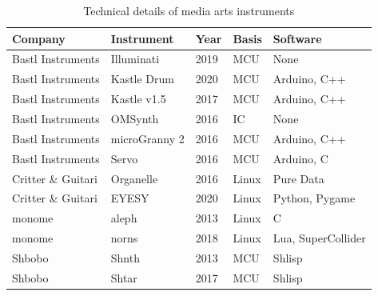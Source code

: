 \begin{table}[ht]
    \centering
    \begin{tabular}{ | l |  l | l | l | l |}
        \hline
        \textbf{Company} & \textbf{Instrument} & \textbf{Year} & \textbf{Basis} & \textbf{Software} \\
        \hline
        Bastl Instruments   & Illuminati    & 2019  & MCU       & None                \\
        \hline
        Bastl Instruments   & Kastle Drum   & 2020  & MCU       & Arduino, C++        \\
        \hline
        Bastl Instruments   & Kastle v1.5   & 2017  & MCU       & Arduino, C++        \\
        \hline
        Bastl Instruments   & OMSynth       & 2016  & IC        & None                \\
        \hline
        Bastl Instruments   & microGranny 2 & 2016  & MCU       & Arduino, C++        \\
        \hline
        Bastl Instruments   & Servo         & 2016  & MCU       & Arduino, C          \\
        \hline
        Critter \& Guitari  & Organelle     & 2016  & Linux     & Pure Data           \\
        \hline
        Critter \& Guitari  & EYESY         & 2020  & Linux     & Python, Pygame      \\
        \hline
        monome              & aleph         & 2013  & Linux     & C                   \\
        \hline
        monome              & norns         & 2018  & Linux     & Lua, SuperCollider  \\
        \hline
        Shbobo              & Shnth         & 2013  & MCU       & Shlisp              \\
        \hline
        Shbobo              & Shtar         & 2017  & MCU       & Shlisp              \\
        \hline
    \end{tabular}
    \caption{Technical details of media arts instruments}
    \label{table:media-arts-instruments-technical}
\end{table}{}

